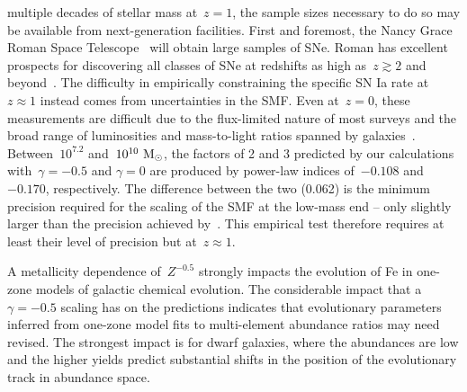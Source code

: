 \documentclass[foo.tex]{subfiles}
\begin{document}
multiple decades of stellar mass at~$z = 1$, the sample sizes necessary to do
so may be available from next-generation facilities.
First and foremost, the Nancy Grace Roman Space Telescope~\citep{Spergel2013,
Spergel2015} will obtain large samples of SNe.
Roman has excellent prospects for discovering all classes of SNe at redshifts
as high as~$z \gtrsim 2$ and beyond~\citep{Petrushevska2016}.
The difficulty in empirically constraining the specific SN Ia rate at
$z \approx 1$ instead comes from uncertainties in the SMF.
Even at~$z = 0$, these measurements are difficult due to the flux-limited
nature of most surveys and the broad range of luminosities and mass-to-light
ratios spanned by galaxies~\citep[see the discussion in][]{Weigel2016}.
Between~$10^{7.2}$ and~$10^{10}~\text{M}_\odot$, the factors of 2 and 3 predicted by our
calculations with~$\gamma = -0.5$ and $\gamma = 0$ are produced by power-law
indices of~$-0.108$ and~$-0.170$, respectively.
The difference between the two (0.062) is the minimum precision required for
the scaling of the SMF at the low-mass end -- only slightly larger than the
precision achieved by~\citet[][$\pm 0.05$, see their Fig. 13]{Baldry2012}.
This empirical test therefore requires at least their level of precision but
at~$z \approx 1$.
\par
A metallicity dependence of~$Z^{-0.5}$ strongly impacts the evolution of Fe
in one-zone models of galactic chemical evolution.
The considerable impact that a~$\gamma = -0.5$ scaling has on the predictions
indicates that evolutionary parameters inferred from one-zone model fits to
multi-element abundance ratios may need revised.
The strongest impact is for dwarf galaxies, where the abundances are low and
the higher yields predict substantial shifts in the position of the
evolutionary track in abundance space.
\end{document}
